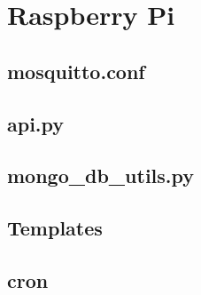 


\section{Raspberry Pi} \label{anexo-rpi}


\subsection{mosquitto.conf} \label{anexo-mosquitto.conf}




\subsection{api.py} \label{api.py}




\subsection{mongo\_db\_utils.py} \label{anexo-flask-mongo}




\subsection{Templates} \label{anexo-device-template}








\subsection{cron} \label{anexo-cron}




